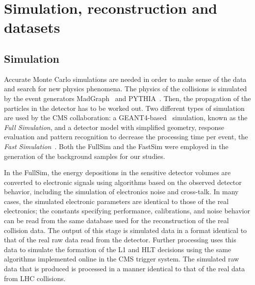 \chapter{Simulation, reconstruction and datasets}
\section{Simulation}
Accurate Monte Carlo simulations are needed in order to make sense of the
data and search for new physics phenomena. The physics of the collisions is
simulated by the event generators MadGraph~\cite{madgraph} and PYTHIA~\cite{fs:pythia}. Then, the propagation of the particles in the detector has to be worked out.
Two different types of simulation are used by the CMS collaboration: a
GEANT4-based~\cite{fs:geant} simulation, known as the \emph{Full
Simulation}, and a detector model with simplified geometry, response
evaluation and pattern recognition to decrease the processing time per
event, the \emph{Fast Simulation}~\cite{fs:fast.simulation}. Both the
FullSim and the FastSim were employed in the generation of the background
samples for our studies.

In the FullSim, the energy depositions in the sensitive detector volumes are converted to electronic
signals using algorithms based on the observed detector behavior, including the simulation of
electronics noise and cross-talk. In many cases, the simulated electronic parameters are identical to
those of the real electronics; the constants specifying performance, calibrations, and noise behavior
can be read from the same database used for the reconstruction of the real collision data. The output of
this stage is simulated data in a format identical to that of the real raw data read from the detector.
Further processing uses this data to simulate the formation of the L1 and
HLT decisions using the same algorithms implemented online in the CMS trigger system. The simulated
raw data that is produced is processed in a manner identical to that of the real data from
LHC collisions.

